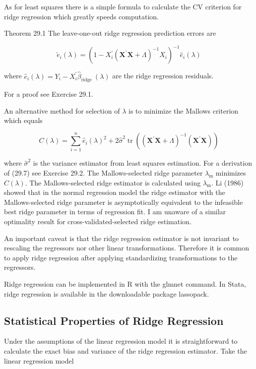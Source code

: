 \documentclass[10pt]{article}
\begin{document}
As for least squares there is a simple formula to calculate the CV criterion for ridge regression which greatly speeds computation.

Theorem 29.1 The leave-one-out ridge regression prediction errors are

$$
\widetilde{e}_{i}(\lambda)=\left(1-X_{i}^{\prime}\left(\boldsymbol{X}^{\prime} \boldsymbol{X}+\Lambda\right)^{-1} X_{i}\right)^{-1} \widehat{e}_{i}(\lambda)
$$

where $\widehat{e}_{i}(\lambda)=Y_{i}-X_{i}^{\prime} \widehat{\beta}_{\text {ridge }}(\lambda)$ are the ridge regression residuals.

For a proof see Exercise 29.1.

An alternative method for selection of $\lambda$ is to minimize the Mallows criterion which equals

$$
C(\lambda)=\sum_{i=1}^{n} \widehat{e}_{i}(\lambda)^{2}+2 \widehat{\sigma}^{2} \operatorname{tr}\left(\left(\boldsymbol{X}^{\prime} \boldsymbol{X}+\Lambda\right)^{-1}\left(\boldsymbol{X}^{\prime} \boldsymbol{X}\right)\right)
$$

where $\widehat{\sigma}^{2}$ is the variance estimator from least squares estimation. For a derivation of (29.7) see Exercise 29.2. The Mallows-selected ridge parameter $\lambda_{\mathrm{m}}$ minimizes $C(\lambda)$. The Mallows-selected ridge estimator is calculated using $\lambda_{\mathrm{m}}$. $\mathrm{Li}$ (1986) showed that in the normal regression model the ridge estimator with the Mallows-selected ridge parameter is asymptotically equivalent to the infeasible best ridge parameter in terms of regression fit. I am unaware of a similar optimality result for cross-validated-selected ridge estimation.

An important caveat is that the ridge regression estimator is not invariant to rescaling the regressors nor other linear transformations. Therefore it is common to apply ridge regression after applying standardizing transformations to the regressors.

Ridge regression can be implemented in $\mathrm{R}$ with the glmnet command. In Stata, ridge regression is available in the downloadable package lassopack.

\subsection{Statistical Properties of Ridge Regression}
Under the assumptions of the linear regression model it is straightforward to calculate the exact bias and variance of the ridge regression estimator. Take the linear regression model
\end{document}
